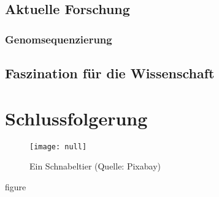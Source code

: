 \documentclass{article}
\begin{document}
			\begin{customEnvironment}
						                \newline

			\end{customEnvironment}




	\chapter{Aktuelle Forschung}

		\section{Genomsequenzierung}



	\chapter{Faszination für die Wissenschaft}



\part{Schlussfolgerung}

	\begin{figure}[h]
		\caption{Ein Schnabeltier (Quelle: Pixabay)}
		\texttt{[image: null]}

	\end{figure}{figure}
\end{document}
